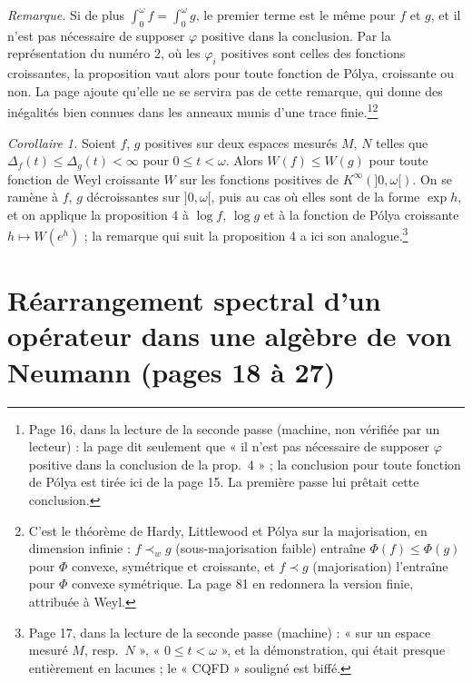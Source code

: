 \documentclass[11pt,a4paper]{article}
\begin{document}
\emph{Remarque.} Si de plus $\int_0^\omega f = \int_0^\omega g$, le premier
terme est le même pour $f$ et $g$, et il n'est pas nécessaire de supposer
$\varphi$ positive dans la conclusion. Par la représentation du numéro 2, où
les $\varphi_i$ positives sont celles des fonctions croissantes, la
proposition vaut alors pour toute fonction de Pólya, croissante ou non. La
page ajoute qu'elle ne se servira pas de cette remarque, qui donne des
inégalités bien connues dans les anneaux munis d'une trace finie.\footnote{Page
16, dans la lecture de la seconde passe (machine, non vérifiée par un
lecteur) : la page dit seulement que « il n'est pas nécessaire de supposer
$\varphi$ positive dans la conclusion de la prop.~4 » ; la conclusion pour
toute fonction de Pólya est tirée ici de la page 15. La première passe lui
prêtait cette conclusion.}\footnote{C'est le théorème de Hardy, Littlewood et Pólya sur la
majorisation, en dimension infinie : $f \prec_w g$ (sous-majorisation faible)
entraîne $\Phi(f) \leq \Phi(g)$ pour $\Phi$ convexe, symétrique et
croissante, et $f \prec g$ (majorisation) l'entraîne pour $\Phi$ convexe
symétrique. La page 81 en redonnera la version finie, attribuée à Weyl.}

\emph{Corollaire 1.} Soient $f$, $g$ positives sur deux espaces mesurés
$M$, $N$ telles que $\Delta_f(t) \leq \Delta_g(t) < \infty$ pour $0 \leq t
< \omega$. Alors $W(f) \leq W(g)$ pour toute fonction de Weyl croissante $W$
sur les fonctions positives de $K^\infty(]0,\omega[)$. On se ramène à $f$,
$g$ décroissantes sur $]0,\omega[$, puis au cas où elles sont de la forme
$\exp h$, et on applique la proposition 4 à $\log f$, $\log g$ et à la
fonction de Pólya croissante $h \mapsto W(e^h)$ ; la remarque qui suit la
proposition 4 a ici son analogue.\footnote{Page 17, dans la lecture de la
seconde passe (machine) : « sur un espace mesuré $M$, resp.\ $N$ », « $0
\leq t < \omega$ », et la démonstration, qui était presque entièrement en
lacunes ; le « CQFD » souligné est biffé.}

\section*{Réarrangement spectral d'un opérateur dans une algèbre de von Neumann (pages 18 à 27)}
\end{document}
